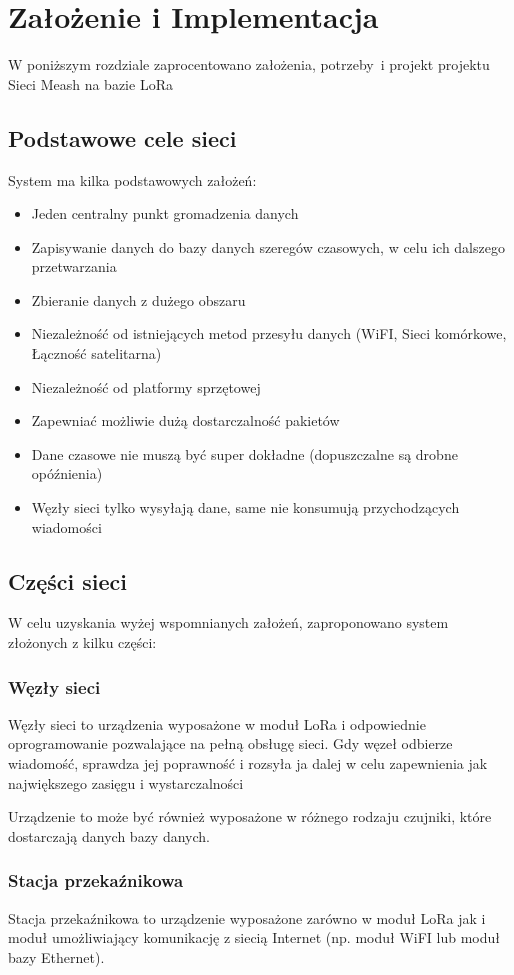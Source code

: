 \chapter{Założenie i Implementacja}
W poniższym rozdziale zaprocentowano założenia, potrzeby~i projekt projektu Sieci Meash na bazie LoRa

\section{Podstawowe cele sieci}
System ma kilka podstawowych założeń:
\begin{itemize}
    \item Jeden centralny punkt gromadzenia danych
    \item Zapisywanie danych do bazy danych szeregów czasowych, w celu ich dalszego przetwarzania
    \item Zbieranie danych z dużego obszaru
    \item Niezależność od istniejących metod przesyłu danych (WiFI, Sieci komórkowe, Łączność satelitarna)
    \item Niezależność od platformy sprzętowej
    \item Zapewniać możliwie dużą dostarczalność pakietów
    \item Dane czasowe nie muszą być super dokładne (dopuszczalne są drobne opóźnienia)
    \item Węzły sieci tylko wysyłają dane, same nie konsumują przychodzących wiadomości
\end{itemize}

\section{Części sieci}
W celu uzyskania wyżej wspomnianych założeń, zaproponowano system złożonych z kilku części:
\subsection{Węzły sieci}
Węzły sieci to urządzenia wyposażone w moduł LoRa i odpowiednie oprogramowanie pozwalające na pełną obsługę sieci. Gdy węzeł odbierze wiadomość, sprawdza jej poprawność i rozsyła ja dalej w celu zapewnienia jak największego zasięgu i wystarczalności

Urządzenie to może być również wyposażone w różnego rodzaju czujniki, które dostarczają danych bazy danych.

\subsection{Stacja przekaźnikowa}
Stacja przekaźnikowa to urządzenie wyposażone zarówno w moduł LoRa jak i moduł umożliwiający komunikację z siecią Internet (np. moduł WiFI lub moduł bazy Ethernet).

